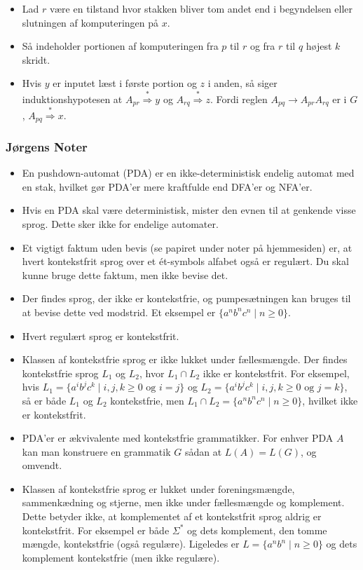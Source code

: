 \begin{frame}[allowframebreaks]
\begin{itemize}
		\item Lad $r$ være en tilstand hvor stakken bliver tom andet end i begyndelsen eller slutningen af komputeringen på $x$.
		\item Så indeholder portionen af komputeringen fra $p$ til $r$ og fra $r$ til $q$ højest $k$ skridt.
		\item Hvis $y$ er inputet læst i første portion og $z$ i anden, så siger induktionshypotesen at $A_{pr} \overset{*}{\Rightarrow} y$ og $A_{rq} \overset{*}{\Rightarrow} z$. Fordi reglen $A_{pq} \rightarrow A_{pr}A_{rq}$ er i $G$, $A_{pq} \overset{*}{\Rightarrow} x$.
	\end{itemize}
\end{frame}

\begin{frame}[allowframebreaks]
	\frametitle{Jørgens Noter}
	\begin{itemize}
		\item En pushdown-automat (PDA) er en ikke-deterministisk endelig automat med en stak, hvilket gør PDA'er mere kraftfulde end DFA'er og NFA'er.
		\item Hvis en PDA skal være deterministisk, mister den evnen til at genkende visse sprog. Dette sker ikke for endelige automater.
		\item Et vigtigt faktum uden bevis (se papiret under noter på hjemmesiden) er, at hvert kontekstfrit sprog over et ét-symbols alfabet også er regulært. Du skal kunne bruge dette faktum, men ikke bevise det.
		\item Der findes sprog, der ikke er kontekstfrie, og pumpesætningen kan bruges til at bevise dette ved modstrid. Et eksempel er $\{a^n b^n c^n \mid n \geq 0\}$.
		\item Hvert regulært sprog er kontekstfrit.
		\item Klassen af kontekstfrie sprog er ikke lukket under fællesmængde. Der findes kontekstfrie sprog $L_1$ og $L_2$, hvor $L_1 \cap L_2$ ikke er kontekstfrit. For eksempel, hvis $L_1 = \{a^i b^j c^k \mid i, j, k \geq 0 \text{ og } i = j\}$ og $L_2 = \{a^i b^j c^k \mid i, j, k \geq 0 \text{ og } j = k\}$, så er både $L_1$ og $L_2$ kontekstfrie, men $L_1 \cap L_2 = \{a^n b^n c^n \mid n \geq 0\}$, hvilket ikke er kontekstfrit.
		\item PDA'er er ækvivalente med kontekstfrie grammatikker. For enhver PDA $A$ kan man konstruere en grammatik $G$ sådan at $L(A) = L(G)$, og omvendt.
		\item Klassen af kontekstfrie sprog er lukket under foreningsmængde, sammenkædning og stjerne, men ikke under fællesmængde og komplement. Dette betyder ikke, at komplementet af et kontekstfrit sprog aldrig er kontekstfrit. For eksempel er både $\Sigma^*$ og dets komplement, den tomme mængde, kontekstfrie (også regulære). Ligeledes er $L = \{a^n b^n \mid n \geq 0\}$ og dets komplement kontekstfrie (men ikke regulære).

\end{itemize}
\end{frame}
